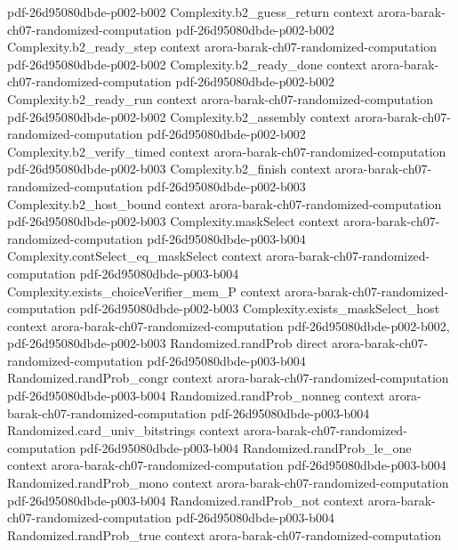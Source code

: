 \begin{theorem}
  {pdf-26d95080dbde-p002-b002}
\proofstep
  {Complexity.b2_guess_return}
  {context}
  {arora-barak-ch07-randomized-computation}
  {pdf-26d95080dbde-p002-b002}
\proofstep
  {Complexity.b2_ready_step}
  {context}
  {arora-barak-ch07-randomized-computation}
  {pdf-26d95080dbde-p002-b002}
\proofstep
  {Complexity.b2_ready_done}
  {context}
  {arora-barak-ch07-randomized-computation}
  {pdf-26d95080dbde-p002-b002}
\proofstep
  {Complexity.b2_ready_run}
  {context}
  {arora-barak-ch07-randomized-computation}
  {pdf-26d95080dbde-p002-b002}
\proofstep
  {Complexity.b2_assembly}
  {context}
  {arora-barak-ch07-randomized-computation}
  {pdf-26d95080dbde-p002-b002}
\proofstep
  {Complexity.b2_verify_timed}
  {context}
  {arora-barak-ch07-randomized-computation}
  {pdf-26d95080dbde-p002-b003}
\proofstep
  {Complexity.b2_finish}
  {context}
  {arora-barak-ch07-randomized-computation}
  {pdf-26d95080dbde-p002-b003}
\proofstep
  {Complexity.b2_host_bound}
  {context}
  {arora-barak-ch07-randomized-computation}
  {pdf-26d95080dbde-p002-b003}
\proofstep
  {Complexity.maskSelect}
  {context}
  {arora-barak-ch07-randomized-computation}
  {pdf-26d95080dbde-p003-b004}
\proofstep
  {Complexity.contSelect_eq_maskSelect}
  {context}
  {arora-barak-ch07-randomized-computation}
  {pdf-26d95080dbde-p003-b004}
\proofstep
  {Complexity.exists_choiceVerifier_mem_P}
  {context}
  {arora-barak-ch07-randomized-computation}
  {pdf-26d95080dbde-p002-b003}
\proofstep
  {Complexity.exists_maskSelect_host}
  {context}
  {arora-barak-ch07-randomized-computation}
  {pdf-26d95080dbde-p002-b002,
    pdf-26d95080dbde-p002-b003}
\proofstep
  {Randomized.randProb}
  {direct}
  {arora-barak-ch07-randomized-computation}
  {pdf-26d95080dbde-p003-b004}
\proofstep
  {Randomized.randProb_congr}
  {context}
  {arora-barak-ch07-randomized-computation}
  {pdf-26d95080dbde-p003-b004}
\proofstep
  {Randomized.randProb_nonneg}
  {context}
  {arora-barak-ch07-randomized-computation}
  {pdf-26d95080dbde-p003-b004}
\proofstep
  {Randomized.card_univ_bitstrings}
  {context}
  {arora-barak-ch07-randomized-computation}
  {pdf-26d95080dbde-p003-b004}
\proofstep
  {Randomized.randProb_le_one}
  {context}
  {arora-barak-ch07-randomized-computation}
  {pdf-26d95080dbde-p003-b004}
\proofstep
  {Randomized.randProb_mono}
  {context}
  {arora-barak-ch07-randomized-computation}
  {pdf-26d95080dbde-p003-b004}
\proofstep
  {Randomized.randProb_not}
  {context}
  {arora-barak-ch07-randomized-computation}
  {pdf-26d95080dbde-p003-b004}
\proofstep
  {Randomized.randProb_true}
  {context}
  {arora-barak-ch07-randomized-computation}

\end{theorem}
